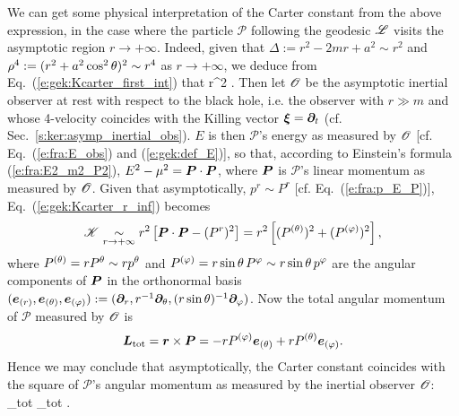 We can get some physical interpretation of the Carter constant from the above
expression, in the case where the particle $\mathscr{P}$ following the
geodesic $\mathscr{L}$ visits the asymptotic region $r\to+\infty$. Indeed, given
that $\Delta := r^2 - 2m r + a^2 \sim r^2$  and $\rho^4 := (r^2 + a^2\cos^2\theta)^2 \sim r^4$
as $r\to+\infty$, we deduce from Eq.~(\ref{e:gek:Kcarter_first_int})
that
\be \label{e:gek:Kcarter_r_inf}
      r^2 \left[ E^2 - \mu^2 - (p^r)^2 \right] .
\ee
Then let $\mathscr{O}$ be the asymptotic inertial observer at rest with respect to the
black hole, i.e. the observer with $r\gg m$ and whose 4-velocity
coincides with the Killing vector
$\bm{\xi} = \bm{\partial}_t$ (cf. Sec.~\ref{s:ker:asymp_inertial_obs}).
$E$ is then $\mathscr{P}$'s energy as measured by $\mathscr{O}$
[cf. Eq.~(\ref{e:fra:E_obs}) and (\ref{e:gek:def_E})], so that, according to
Einstein's formula (\ref{e:fra:E2_m2_P2}), $E^2 - \mu^2 = \bm{P}\cdot\bm{P}$, where
$\bm{P}$ is $\mathscr{P}$'s linear momentum as measured by $\mathscr{O}$. Given
that asymptotically, $p^r\sim P^r$ [cf. Eq.~(\ref{e:fra:p_E_P})],
Eq.~(\ref{e:gek:Kcarter_r_inf}) becomes
\[
    \mathscr{K} \underset{r\to + \infty}{\sim} r^2 \left[ \bm{P}\cdot\bm{P} - (P^r)^2 \right]
    = r^2 \left[ (P^{(\theta)})^2 + (P^{(\varphi)})^2 \right],
\]
where $P^{(\theta)} = r P^\theta \sim r p^\theta$ and $P^{(\varphi)} = r\sin\theta\, P^\varphi \sim r\sin\theta\, p^\varphi$
are the angular components of $\bm{P}$ in the
orthonormal basis $(\bm{e}_{(r)}, \bm{e}_{(\theta)}, \bm{e}_{(\varphi)}) := (\bm{\partial}_r, r^{-1} \bm{\partial}_\theta,
(r\sin\theta)^{-1}\bm{\partial}_\varphi)$.
Now the total angular momentum of $\mathscr{P}$ measured by $\mathscr{O}$ is
\[
    \bm{L}_{\rm tot} = \bm{r} \times \bm{P} = - r P^{(\varphi)} \bm{e}_{(\theta)}
        + r P^{(\theta)} \bm{e}_{(\varphi)} .
\]
Hence we may conclude that asymptotically, the Carter constant coincides with
the square of $\mathscr{P}$'s angular momentum as measured by the inertial observer $\mathscr{O}$:
\be \label{e:gek:Kcarter_asymptot}
      _{\rm tot} \cdot {}_{\rm tot} .
\ee


